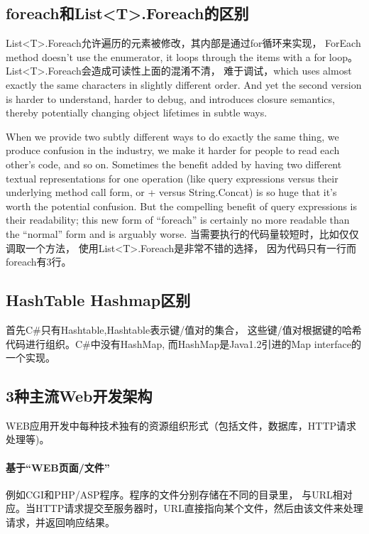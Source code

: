 \documentclass{book}
\begin{document}
\subsection{foreach和List<T>.Foreach的区别}

List<T>.Foreach允许遍历的元素被修改，其内部是通过for循环来实现，
ForEach method doesn't use the enumerator, 
it loops through the items with a for loop。
List<T>.Foreach会造成可读性上面的混淆不清，
难于调试，which uses almost exactly the same characters in slightly different order. And yet the second version is harder to understand, harder to debug, and introduces closure semantics, 
thereby potentially changing object lifetimes in subtle ways.

When we provide two subtly different ways to do exactly the same thing, we produce confusion in the industry, 
we make it harder for people to read each other’s code, and so on. Sometimes the benefit added by having two different textual representations for one operation (like query expressions versus their underlying method call form, or + versus String.Concat) is so huge that it’s worth the potential confusion. But the compelling benefit of query expressions is their readability; this new form of “foreach” is certainly no more readable than the “normal” form and is arguably worse.
当需要执行的代码量较短时，比如仅仅调取一个方法，
使用List<T>.Foreach是非常不错的选择，
因为代码只有一行而foreach有3行。


\subsection{HashTable Hashmap区别}

首先C\#只有Hashtable,Hashtable表示键/值对的集合，
这些键/值对根据键的哈希代码进行组织。C\#中没有HashMap,
而HashMap是Java1.2引进的Map interface的一个实现。

\subsection{3种主流Web开发架构}

WEB应用开发中每种技术独有的资源组织形式（包括文件，数据库，HTTP请求处理等)。

\paragraph{基于“WEB页面/文件”}例如CGI和PHP/ASP程序。程序的文件分别存储在不同的目录里，
与URL相对应。当HTTP请求提交至服务器时，URL直接指向某个文件，然后由该文件来处理请求，并返回响应结果。
\end{document}
